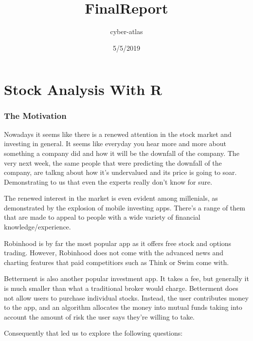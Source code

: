 \documentclass[]{article}
\title{FinalReport}
\author{cyber-atlas}
\date{5/5/2019}
\begin{document}
\maketitle

\hypertarget{stock-analysis-with-r}{%
\section{\texorpdfstring{\textbf{Stock Analysis With
R}}{Stock Analysis With R}}\label{stock-analysis-with-r}}

\hypertarget{the-motivation}{%
\subsubsection{\texorpdfstring{\textbf{The
Motivation}}{The Motivation}}\label{the-motivation}}

Nowadays it seems like there is a renewed attention in the stock market
and investing in general. It seems like everyday you hear more and more
about something a company did and how it will be the downfall of the
company. The very next week, the same people that were predicting the
downfall of the company, are talkng about how it's undervalued and its
price is going to soar. Demonstrating to us that even the experts really
don't know for sure.

The renewed interest in the market is even evident among millenials, as
demonstrated by the explosion of mobile investing apps. There's a range
of them that are made to appeal to people with a wide variety of
financial knowledge/experience.

Robinhood is by far the most popular app as it offers free stock and
options trading. However, Robinhood does not come with the advanced news
and charting features that paid competitiors such as Think or Swim come
with.

Betterment is also another popular investment app. It takes a fee, but
generally it is much smaller than what a traditional broker would
charge. Betterment does not allow users to purchase individual stocks.
Instead, the user contributes money to the app, and an algorithm
allocates the money into mutual funds taking into account the amount of
risk the user says they're willing to take.

Consequently that led us to explore the following questions:
\end{document}
